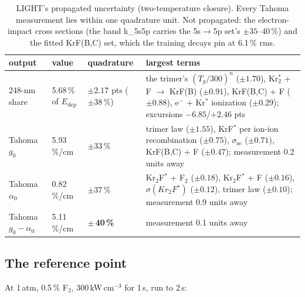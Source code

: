 \documentclass[11pt]{article}
\newcommand{\el}{\ensuremath{\mathrm{e}^-}}
\newcommand{\Krs}{Kr\ensuremath{^*}}
\newcommand{\Krts}{Kr\ensuremath{_2^*}}
\newcommand{\KrtF}{Kr\ensuremath{_2}F\ensuremath{^*}}
\newcommand{\Ft}{F\ensuremath{_2}}
\newcommand{\Edep}{\ensuremath{E_\mathrm{dep}}}
\newcommand{\unc}[1]{\colorbox{hlbg}{\textbf{#1}}}
\begin{document}
\begin{table}[H]
\small
\begin{tabularx}{\textwidth}{@{}lllX@{}}
\toprule
output & value & quadrature & largest terms \\
\midrule
248-nm share & 5.68\,\% of \Edep{} & $\pm 2.17$ pts ($\pm 38$\,\%) & the trimer's $(T_g/300)^n$ ($\pm 1.70$), \Krts{} + F $\to$ KrF(B) ($\pm 0.91$), KrF(B,C) + F ($\pm 0.88$), \el{} + \Krs{} ionization ($\pm 0.29$); excursions $-6.85$/$+2.46$ pts \\
Tahoma $g_0$ & 5.93\,\%/cm & $\pm 33$\,\% & trimer law ($\pm 1.55$), KrF$^*$ per ion-ion recombination ($\pm 0.75$), $\sigma_\mathrm{se}$ ($\pm 0.71$), KrF(B,C) + F ($\pm 0.47$); measurement 0.2 units away \\
Tahoma $\alpha_0$ & 0.82\,\%/cm & $\pm 37$\,\% & \KrtF{} + \Ft{} ($\pm 0.18$), \KrtF{} + F ($\pm 0.16$), $\sigma(\KrtF)$ ($\pm 0.12$), trimer law ($\pm 0.10$); measurement 0.9 units away \\
Tahoma $g_0-\alpha_0$ & 5.11\,\%/cm & \unc{$\pm$\,40\,\%} & measurement 0.1 units away \\
\bottomrule
\end{tabularx}
\caption{LIGHT's propagated uncertainty (two-temperature closure). Every
Tahoma measurement lies within one quadrature unit. Not propagated: the
electron-impact cross sections (the band \textsf{k\_5s5p} carries the
5s$\to$5p set's $\pm 35$--40\,\%) and the fitted KrF(B,C) set, which the
training decays pin at 6.1\,\% rms.}
\end{table}

\subsection{The reference point}

At 1\,atm, 0.5\,\% \Ft{}, 300\,kW\,cm$^{-3}$ for 1\,\textmu s, run to 2\,\textmu s:
\end{document}
